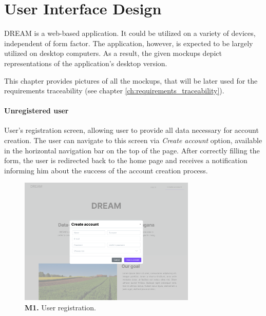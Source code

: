 \chapter{User Interface Design}

DREAM is a web-based application. It could be utilized on a variety of devices, independent of form factor. The application, however, is expected to be largely utilized on desktop computers. As a result, the given mockups depict representations of the application's desktop version.

This chapter provides pictures of all the  mockups, that will be later used for the requirements traceability (see chapter \ref{ch:requirements_traceability}).

\subsubsection{Unregistered user}

User's registration screen, allowing user to provide all data necessary for account creation. The user can navigate to this screen via \textit{Create account} option, available in the horizontal navigation bar on the top of the page. After correctly filling the form, the user is redirected back to the home page and receives a notification informing him about the success of the account creation process.
\begin{figure}[H]
    \centering
    \includegraphics[width=0.75\textwidth]{mockups/Unreg. user_Create account.png}
    \caption{\textbf{M1.} User registration.}
    \label{fig:user-create-account}
\end{figure}


